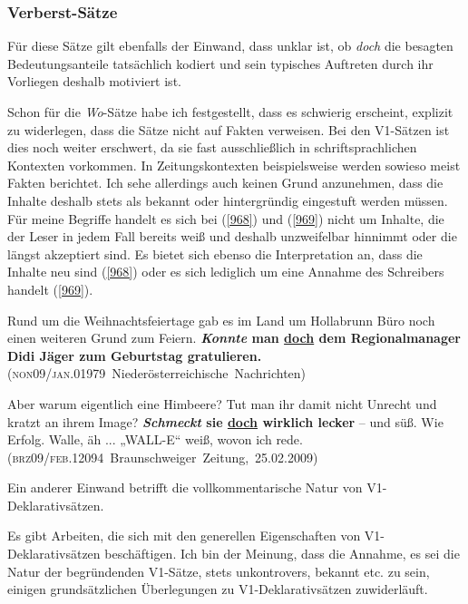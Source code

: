 {\subsubsection{Verberst-Sätze}
Für diese Sätze gilt ebenfalls der Einwand, dass unklar ist, ob \textit{doch} die besagten Bedeutungsanteile tatsächlich kodiert und sein typisches Auftreten durch ihr Vorliegen deshalb motiviert ist.

Schon für die \textit{Wo}-Sätze habe ich festgestellt, dass es schwierig erscheint, explizit zu widerlegen, dass die Sätze nicht auf Fakten verweisen. Bei den V1-Sätzen ist dies noch weiter erschwert, da sie fast ausschließlich in schriftsprachlichen Kontexten vorkommen. In Zeitungskontexten beispielsweise werden sowieso meist Fakten berichtet. Ich sehe allerdings auch keinen Grund anzunehmen, dass die Inhalte deshalb stets als bekannt oder hintergründig eingestuft werden müssen. Für meine Begriffe handelt es sich bei (\ref{968}) und (\ref{969}) nicht um Inhalte, die der Leser in jedem Fall bereits weiß und deshalb unzweifelbar hinnimmt oder die längst akzeptiert sind. Es bietet sich ebenso die Interpretation an, dass die Inhalte neu sind (\ref{968}) oder es sich lediglich um eine Annahme des Schreibers handelt (\ref{969}).
	
\begin{exe}
	\ex\label{968}

	Rund um die Weihnachtsfeiertage gab es im Land um Hollabrunn Büro noch einen weiteren Grund zum Feiern. \textbf{\textit{Konnte} man \ul{doch} 		dem Regionalmanager Didi Jäger zum Geburtstag gratulieren.}
	\newline
	\hbox{}\hfill\hbox{(\textsc{non09/jan.01979} Niederösterreichische Nachrichten)}
\end{exe}	

\begin{exe}
	\ex\label{969}

	Aber warum eigentlich eine Himbeere? Tut man ihr damit nicht Unrecht und kratzt an ihrem Image? \textbf{\textit{Schmeckt} sie \ul{doch} wirklich 	lecker} – und süß. Wie Erfolg. Walle, äh ... „WALL-E“ weiß, wovon ich rede.
	\newline\hbox{}\hfill\hbox{(\textsc{brz09/feb.12094} Braunschweiger Zeitung, 25.02.2009)}
\end{exe}
Ein anderer Einwand betrifft die vollkommentarische Natur  von V1-De\-kla\-ra\-tiv\-sät\-zen. 

Es gibt Arbeiten, die sich mit den generellen Eigenschaften von V1-De\-kla\-ra\-tiv\-sät\-zen beschäftigen. Ich bin der Meinung, dass die Annahme, es sei die Natur der begründenden V1-Sätze, stets unkontrovers, bekannt etc. zu sein, einigen grundsätzlichen Überlegungen zu V1-Deklarativsätzen zuwiderläuft.

}
